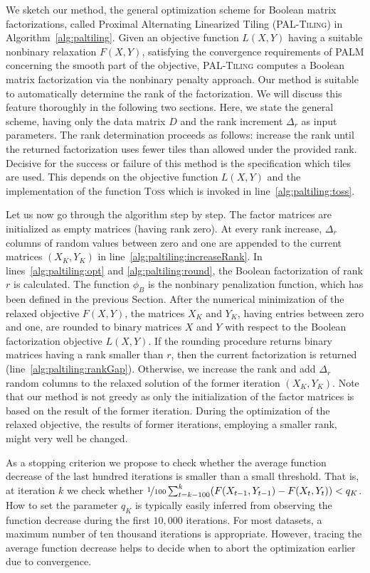 We sketch our method, the general optimization scheme for Boolean matrix factorizations, called Proximal Alternating Linearized Tiling (\textsc{PAL-Tiling}) in Algorithm~\ref{alg:paltiling}. Given an objective function $L(X,Y)$ having a suitable nonbinary relaxation $F(X,Y)$, satisfying the convergence requirements of PALM concerning the smooth part of the objective, \textsc{PAL-Tiling} computes a Boolean matrix factorization via the nonbinary penalty approach. Our method is suitable to automatically determine the rank of the factorization. We will discuss this feature thoroughly in the following two sections. Here, we state the general scheme, having only the data matrix $D$ and the rank increment $\Delta_r$ as input parameters. The rank determination proceeds as follows: increase the rank until the returned factorization uses fewer tiles than allowed under the provided rank. Decisive for the success or failure of this method is the specification which tiles are used. This depends on the objective function $L(X,Y)$ and the implementation of the function \textsc{Toss} which is invoked in line~\ref{alg:paltiling:toss}.

Let us now go through the algorithm step by step. 
The factor matrices are initialized as empty matrices (having rank zero). At every rank increase, $\Delta_r$ columns of random values between zero and one are appended to the current matrices $(X_K,Y_K)$ in line~\ref{alg:paltiling:increaseRank}. In lines~\ref{alg:paltiling:opt} and \ref{alg:paltiling:round}, the Boolean factorization of rank $r$ is calculated. The function $\phi_B$ is the nonbinary penalization function, which has been defined in the previous Section. After the numerical minimization of the relaxed objective $F(X,Y)$, the matrices $X_K$ and $Y_K$, having entries between zero and one, are rounded to binary matrices $X$ and $Y$ with respect to the Boolean factorization objective $L(X,Y)$. If the rounding procedure returns binary matrices having a rank smaller than $r$, then the current factorization is returned (line~\ref{alg:paltiling:rankGap}). Otherwise, we increase the rank and add $\Delta_r$ random columns to the relaxed solution of the former iteration $(X_K,Y_K)$. Note that our method is not greedy as only the initialization of the factor matrices is based on the result of the former iteration. During the optimization of the relaxed objective, the results of former iterations, employing a smaller rank, might very well be changed.

As a stopping criterion we propose to check whether the average function decrease of the last hundred iterations is smaller than a small threshold. That is, at iteration $k$ we check whether $\nicefrac{1}{100}\sum_{t=k-100}^k(F(X_{t-1},Y_{t-1})-F(X_t,Y_t))<q_K$. How to set the parameter $q_K$ is typically easily inferred from observing the function decrease during the first $10,000$ iterations. For most datasets, a maximum number of ten thousand iterations is appropriate. However, tracing the average function decrease helps to decide when to abort the optimization earlier due to convergence. 

